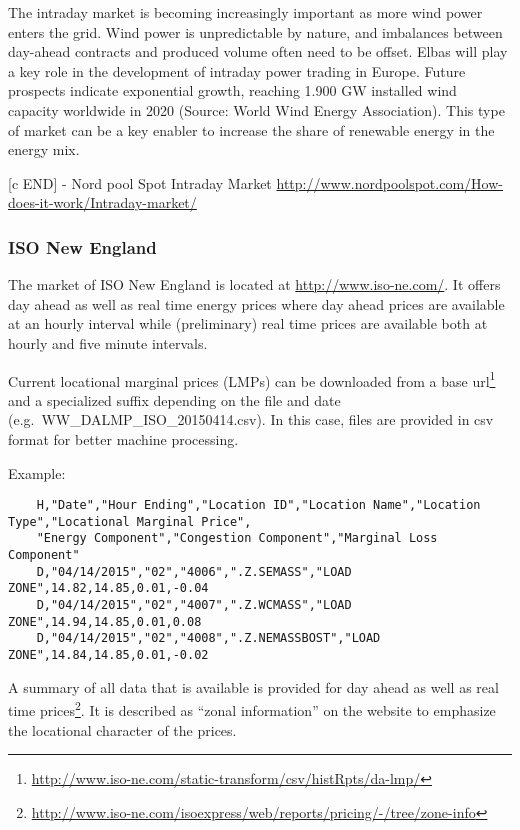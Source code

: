 The intraday market is becoming increasingly important as more wind power enters the grid. Wind power is unpredictable by nature, and imbalances between day-ahead contracts and produced volume often need to be offset. Elbas will play a key role in the development of intraday power trading in Europe. Future prospects indicate exponential growth, reaching 1.900 GW installed wind capacity worldwide in 2020 (Source: World Wind Energy Association). This type of market can be a key enabler to increase the share of renewable energy in the energy mix. 

[c END] - Nord pool Spot Intraday Market \url{http://www.nordpoolspot.com/How-does-it-work/Intraday-market/}




\subsubsection{ISO New England}

The market of ISO New England is located at \url{http://www.iso-ne.com/}. It offers day ahead as well as real time energy prices where day ahead prices are available at an hourly interval while (preliminary) real time prices are available both at hourly and five minute intervals. 

Current locational marginal prices (LMPs) can be downloaded from a base url\footnote{\url{http://www.iso-ne.com/static-transform/csv/histRpts/da-lmp/}} and a specialized suffix depending on the file and date (e.g.~WW\_DALMP\_ISO\_20150414.csv). In this case, files are provided in csv format for better machine processing. 

Example: 
\begin{verbatim}
	H,"Date","Hour Ending","Location ID","Location Name","Location Type","Locational Marginal Price",
	"Energy Component","Congestion Component","Marginal Loss Component"
	D,"04/14/2015","02","4006",".Z.SEMASS","LOAD ZONE",14.82,14.85,0.01,-0.04
	D,"04/14/2015","02","4007",".Z.WCMASS","LOAD ZONE",14.94,14.85,0.01,0.08
	D,"04/14/2015","02","4008",".Z.NEMASSBOST","LOAD ZONE",14.84,14.85,0.01,-0.02
\end{verbatim}

A summary of all data that is available is provided for day ahead as well as real time prices\footnote{\url{http://www.iso-ne.com/isoexpress/web/reports/pricing/-/tree/zone-info}}. It is described as ``zonal information'' on the website to emphasize the locational character of the prices. 



